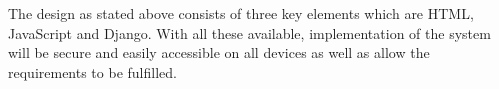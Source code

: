 \documentclass[../main.tex]{subfiles}
\begin{document}
\raggedright
The design as stated above consists of three key elements which are HTML, JavaScript and Django. With all these available, implementation of the system will be secure and easily accessible on all devices as well as allow the requirements to be fulfilled. 
\end{document}
